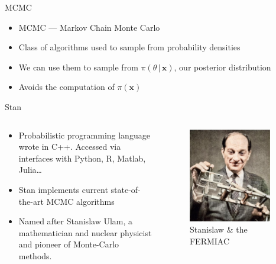 \documentclass[aspectratio=169]{beamer}
\begin{document}
\begin{frame}{MCMC}
  \begin{itemize}
    \item MCMC --- Markov Chain Monte Carlo
    \item Class of algorithms used to sample from probability densities
    \item We can use them to sample from $\pi(\theta \, | \, \bm{x})$, our
          posterior distribution
    \item Avoids the computation of $\pi(\bm{x})$
  \end{itemize}
\end{frame}

\begin{frame}{Stan}
  \begin{columns}
    \begin{column}{0.6\textwidth}
      \begin{itemize}
        \item Probabilistic programming language wrote in C++. Accessed via
              interfaces with Python, R, Matlab, Julia\ldots
        \item Stan implements current state-of-the-art MCMC algorithms
        \item Named after Stanislaw Ulam, a mathematician and nuclear physicist and
              pioneer of Monte-Carlo methods.
      \end{itemize}
    \end{column}
    \begin{column}{0.4\textwidth}
      \begin{figure}
        \includegraphics[width=0.9\textwidth]{stan.jpg}
        \caption{Stanislaw \& the FERMIAC}
      \end{figure}
    \end{column}
  \end{columns}
\end{frame}
\end{document}

